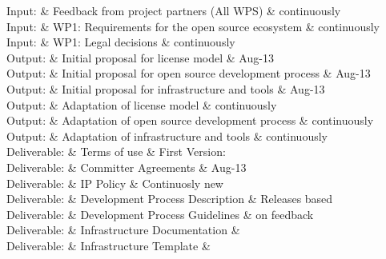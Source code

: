 \documentclass{template/openetcs_article}
\begin{document}
\begin{inoutput}
Input: & Feedback from project partners (All WPS) & continuously \\
Input: & WP1: Requirements for the open source ecosystem & continuously \\
Input: & WP1: Legal decisions & continuously \\
\hline
Output: & Initial proposal for license model & Aug-13 \\
Output: & Initial proposal for open source development process & Aug-13 \\
Output: & Initial proposal for infrastructure and tools & Aug-13 \\
Output: & Adaptation of license model & continuously \\
Output: & Adaptation of open source development process & continuously \\
Output: & Adaptation of infrastructure and tools & continuously \\
\hline
Deliverable: & Terms of use & First Version: \\
Deliverable: & Committer Agreements & Aug-13\\
Deliverable: & IP Policy & Continuosly new\\ 
Deliverable: & Development Process Description & Releases based\\ 
Deliverable: & Development Process Guidelines & on feedback\\ 
Deliverable: & Infrastructure Documentation & \\
Deliverable: & Infrastructure Template & \\
\end{inoutput}
\end{document}
